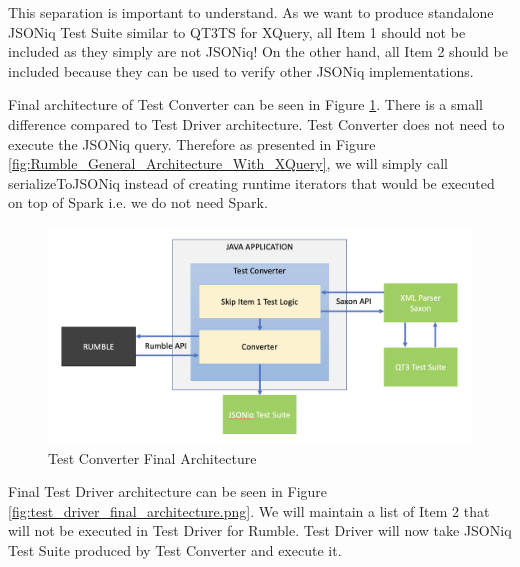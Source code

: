 This separation is important to understand. As we want to produce standalone JSONiq Test Suite similar to QT3TS for XQuery, all Item 1 should not be included as they simply are not JSONiq! On the other hand, all Item 2 should be included because they can be used to verify other JSONiq implementations. 

Final architecture of Test Converter can be seen in Figure \ref{fig:test_converter_final_architecture.png}. There is a small difference compared to Test Driver architecture. Test Converter does not need to execute the JSONiq query. Therefore as presented in Figure \ref{fig:Rumble_General_Architecture_With_XQuery}, we will simply call serializeToJSONiq instead of creating runtime iterators that would be executed on top of Spark i.e. we do not need Spark. 

\begin{figure}[h!]
	\vspace*{-5mm}
	\includegraphics[width=\linewidth]{test_converter_final_architecture.png}
	\vspace*{-10mm}
	\caption{Test Converter Final Architecture}
	\label{fig:test_converter_final_architecture.png}
\end{figure}

\vspace*{-5mm}
Final Test Driver architecture can be seen in Figure \ref{fig:test_driver_final_architecture.png}. We will maintain a list of Item 2 that will not be executed in Test Driver for Rumble. Test Driver will now take JSONiq Test Suite produced by Test Converter and execute it. 


